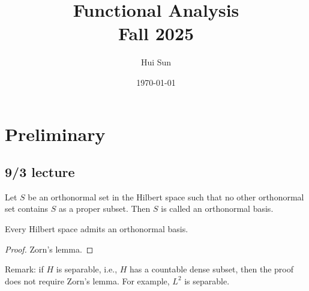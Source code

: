 \documentclass[openany]{book}
\title{Functional Analysis
\\ 
\vspace{0.4cm}
\large Fall 2025}
\date{\today}
\author{Hui Sun}
\begin{document}
\maketitle

\chapter{Preliminary}

\section{9/3 lecture}



\begin{defn}
    Let $S$ be an orthonormal set in the Hilbert space such that no other orthonormal set contains $S$ as a proper subset. Then $S$ is called an orthonormal basis.
\end{defn}

\begin{prop}
    Every Hilbert space admits an orthonormal basis.
\end{prop}
\begin{proof}
    Zorn's lemma.
\end{proof}
Remark: if $H$ is separable, i.e., $H$ has a countable dense subset, then the proof does not require Zorn's lemma. For example, $L^2$ is separable.
\end{document}
